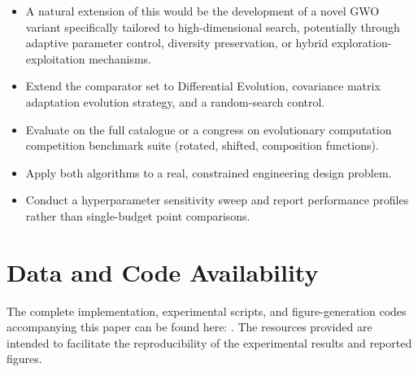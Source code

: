 \documentclass[journal]{IEEEtran}
\begin{document}
\begin{itemize}
  \item A natural extension of this would be the development of a novel GWO variant specifically tailored to high-dimensional search, potentially through adaptive parameter control, diversity preservation, or hybrid exploration-exploitation mechanisms.
  \item Extend the comparator set to Differential Evolution, covariance matrix adaptation evolution strategy, and a random-search control.
  \item Evaluate on the full \cite{jamil2013} catalogue or a congress on evolutionary computation competition benchmark suite (rotated, shifted, composition functions).
  \item Apply both algorithms to a real, constrained engineering design problem.
  \item Conduct a hyperparameter sensitivity sweep and report performance profiles rather than single-budget point comparisons.
  
\end{itemize}

\section*{Data and Code Availability}

The complete implementation, experimental scripts, and figure-generation codes accompanying this paper can be found here: \href{}{}. The resources provided are intended to facilitate the reproducibility of the experimental results and reported figures.


%
\end{document}
